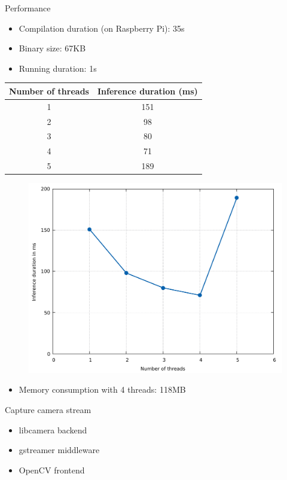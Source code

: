 \begin{frame}{Performance}
  \begin{itemize}
	\item Compilation duration (on Raspberry Pi): 35s
	\item Binary size: 67KB
	\item Running duration: 1s
  \end{itemize}
  \begin{table}
    {\tiny
	\begin{tabular}{|c|c|}
	  \hline
		\textbf{Number of threads} & \textbf{Inference duration (ms)} \\
	  \hline
		1 & 151 \\
	  \hline
		2 & 98 \\
	  \hline
		3 & 80 \\
	  \hline
		4 & 71 \\
	  \hline
		5 & 189 \\
	  \hline
	\end{tabular}
	}
  \end{table}
  \begin{figure}
	\includegraphics[width=\linewidth,height=0.45\textheight,keepaspectratio]{images/inference_duration_rps.pdf}
  \end{figure}
  \begin{itemize}
	\item Memory consumption with 4 threads: 118MB
  \end{itemize}
\end{frame}

\begin{frame}{Capture camera stream}
  \begin{itemize}
	\item libcamera backend
	\item gstreamer middleware
	\item OpenCV frontend
  \end{itemize}
\end{frame}

